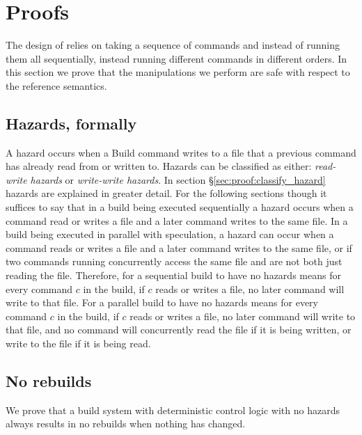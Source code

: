 \section{Proofs}
\label{sec:proof}

The design of \Rattle relies on taking a sequence of commands and instead of running them all sequentially, instead running different commands in different orders. In this section we prove that the manipulations we perform are safe with respect to the reference semantics.

\subsection{Hazards, formally}

A hazard occurs when a Build command writes to a file that a previous command has already read from or written to.  Hazards can be classified as either: \emph{read-write hazards} or \emph{write-write hazards}.  In section \S\ref{sec:proof:classify_hazard} hazards are explained in greater detail.  For the following sections though it suffices to say that in a build being executed sequentially a
hazard occurs when a command read or writes a file and a later command writes to the same file.  In a build being executed in parallel with speculation, a hazard can occur when a command reads or writes a file and a later command writes to the same file, or if two commands running concurrently access the same file and are not both just reading the file.  Therefore, for a sequential \Rattle build to have no hazards means for every command $c$ in the build, if $c$ reads or writes a file, no later command will write to that file.  For a parallel \Rattle build to have no hazards means for every command $c$ in the build, if $c$ reads or writes a file, no later command will write to that file, and no command will concurrently read the file if it is being written, or write to the file if it is being read.


\subsection{No rebuilds}
\label{sec:proof:no_rebuild}

We prove that a build system with deterministic control logic with no hazards always results in no rebuilds when nothing has changed.

